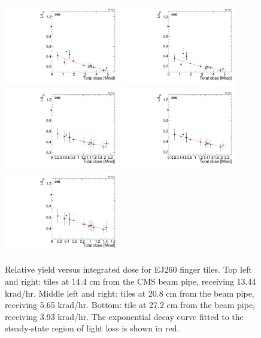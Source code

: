 \begin{figure}[tbp!]
\centering
\includegraphics[width=0.45\textwidth]{figures/EJ260-F-14p4cm-f6ch0-dose.pdf}
\includegraphics[width=0.45\textwidth]{figures/EJ260-F-14p4cm-f8ch1-dose.pdf}
\includegraphics[width=0.45\textwidth]{figures/EJ260-F-20p8cm-f3ch4-dose.pdf}
\includegraphics[width=0.45\textwidth]{figures/EJ260-F-20p8cm-f7ch1-dose.pdf}
\includegraphics[width=0.45\textwidth]{figures/EJ260-F-27p2cm-f8ch3-dose.pdf}
\caption{Relative yield versus integrated dose for EJ260 finger tiles. Top left and right: tiles at 14.4 cm from the CMS beam pipe, receiving 13.44 krad/hr. Middle left and right: tiles at 20.8 cm from the beam pipe, receiving 5.65 krad/hr. Bottom: tile at 27.2 cm from the beam pipe, receiving 3.93 krad/hr. The exponential decay curve fitted to the steady-state region of light loss is shown in red.}
\label{fig:EJ260-F-dose}
\end{figure} 


